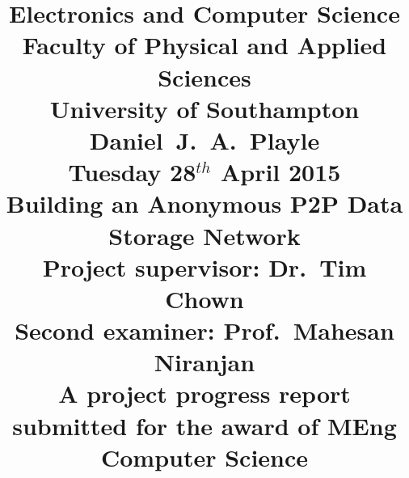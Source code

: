 \title{ \vspace{-1.0cm}
	Electronics and Computer Science\\
	Faculty of Physical and Applied Sciences\\
	University of Southampton\\
	\vspace{2.5cm}
	Daniel~J.~A.~Playle\\
	\vspace{1.0cm}
	Tuesday 28$^{th}$ April 2015\\
	\vspace{1.5cm}
	\textbf{Building an Anonymous P2P Data Storage Network}\\
	\vspace{2.5cm}
	Project supervisor: Dr.~Tim Chown\\
	Second examiner: Prof.~Mahesan Niranjan\\
	\vspace{1.5cm}
	A project progress report submitted for the award of MEng Computer Science\vspace{-3.0cm}}
\author{}
\date{}
\maketitle
